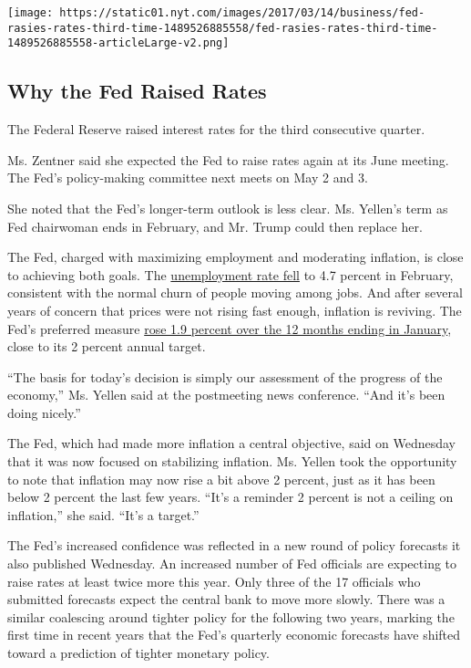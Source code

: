 \href{https://www.nytimes.com/interactive/2017/03/15/business/federal-reserve-interest-rates.html}{}

\texttt{[image: https://static01.nyt.com/images/2017/03/14/business/fed-rasies-rates-third-time-1489526885558/fed-rasies-rates-third-time-1489526885558-articleLarge-v2.png]}

\hypertarget{why-the-fed-raised-rates}{%
\subsection{Why the Fed Raised Rates}\label{why-the-fed-raised-rates}}

The Federal Reserve raised interest rates for the third consecutive
quarter.

Ms. Zentner said she expected the Fed to raise rates again at its June
meeting. The Fed's policy-making committee next meets on May 2 and 3.

She noted that the Fed's longer-term outlook is less clear. Ms. Yellen's
term as Fed chairwoman ends in February, and Mr. Trump could then
replace her.

The Fed, charged with maximizing employment and moderating inflation, is
close to achieving both goals. The
\href{https://www.nytimes.com/2017/03/10/business/economy/february-unemployment-jobs-report.html}{unemployment
rate fell} to 4.7 percent in February, consistent with the normal churn
of people moving among jobs. And after several years of concern that
prices were not rising fast enough, inflation is reviving. The Fed's
preferred measure
\href{https://www.bea.gov/newsreleases/national/pi/2017/pdf/pi0117.pdf}{rose
1.9 percent over the 12 months ending in January}, close to its 2
percent annual target.

``The basis for today's decision is simply our assessment of the
progress of the economy,'' Ms. Yellen said at the postmeeting news
conference. ``And it's been doing nicely.''

The Fed, which had made more inflation a central objective, said on
Wednesday that it was now focused on stabilizing inflation. Ms. Yellen
took the opportunity to note that inflation may now rise a bit above 2
percent, just as it has been below 2 percent the last few years. ``It's
a reminder 2 percent is not a ceiling on inflation,'' she said. ``It's a
target.''

The Fed's increased confidence was reflected in a new round of policy
forecasts it also published Wednesday. An increased number of Fed
officials are expecting to raise rates at least twice more this year.
Only three of the 17 officials who submitted forecasts expect the
central bank to move more slowly. There was a similar coalescing around
tighter policy for the following two years, marking the first time in
recent years that the Fed's quarterly economic forecasts have shifted
toward a prediction of tighter monetary policy.

